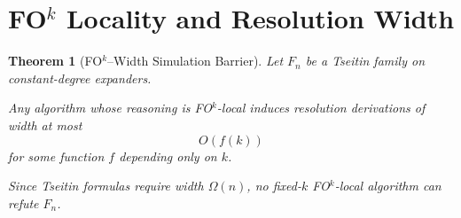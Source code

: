 \documentclass{article}
\newtheorem{theorem}{Theorem}
\begin{document}
\section{FO$^k$ Locality and Resolution Width}

\begin{theorem}[FO$^k$–Width Simulation Barrier]
Let $F_n$ be a Tseitin family on constant-degree expanders.

Any algorithm whose reasoning is FO$^k$-local
induces resolution derivations of width at most
\[
O(f(k))
\]
for some function $f$ depending only on $k$.

Since Tseitin formulas require width $\Omega(n)$,
no fixed-$k$ FO$^k$-local algorithm can refute $F_n$.
\end{theorem}
\end{document}

